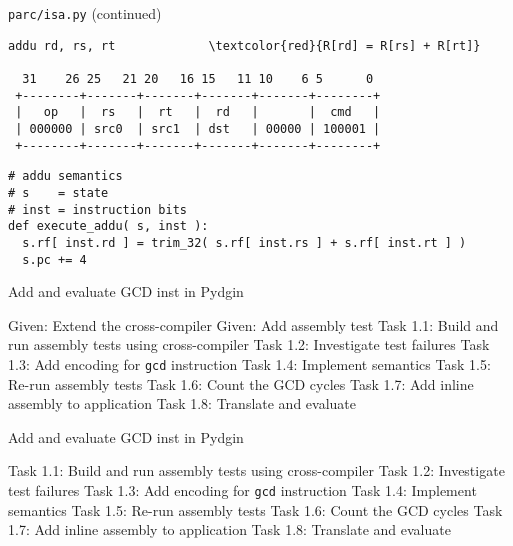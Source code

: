 
\begin{frame}[fragile]{\texttt{parc/isa.py} (continued)}

\begin{Verbatim}[commandchars=\\\{\}]
  addu rd, rs, rt             \textcolor{red}{R[rd] = R[rs] + R[rt]}

  31    26 25   21 20   16 15   11 10    6 5      0
 +--------+-------+-------+-------+-------+--------+
 |   op   |  rs   |  rt   |  rd   |       |  cmd   |
 | 000000 | src0  | src1  | dst   | 00000 | 100001 |
 +--------+-------+-------+-------+-------+--------+

\end{Verbatim}

\vspace{-20pt}

\begin{lstlisting}[numbers=none]
# addu semantics
# s    = state
# inst = instruction bits
def execute_addu( s, inst ):
  s.rf[ inst.rd ] = trim_32( s.rf[ inst.rs ] + s.rf[ inst.rt ] )
  s.pc += 4
\end{lstlisting}
\end{frame}


\begin{frame}{ Add and evaluate GCD inst in Pydgin}
\begin{cbxlist}
  \1 Given: Extend the cross-compiler
  \1 Given: Add assembly test
  \1 Task 1.1: Build and run assembly tests using cross-compiler
  \1 Task 1.2: Investigate test failures
  \1 Task 1.3: Add encoding for \texttt{gcd} instruction
  \1 Task 1.4: Implement semantics
  \1 Task 1.5: Re-run assembly tests
  \1 Task 1.6: Count the GCD cycles
  \1 Task 1.7: Add inline assembly to application
  \1 Task 1.8: Translate and evaluate
\end{cbxlist}
\end{frame}

\begin{frame}{ Add and evaluate GCD inst in Pydgin}
\begin{cbxlist}
  \1 
  \1 
  \1 Task 1.1: Build and run assembly tests using cross-compiler
  \1 Task 1.2: Investigate test failures
  \1 Task 1.3: Add encoding for \texttt{gcd} instruction
  \1 Task 1.4: Implement semantics
  \1 Task 1.5: Re-run assembly tests
  \1 Task 1.6: Count the GCD cycles
  \1 Task 1.7: Add inline assembly to application
  \1 Task 1.8: Translate and evaluate
\end{cbxlist}
\end{frame}

